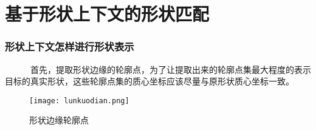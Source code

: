 \documentclass[notheorems,mathserif,table,compress]{beamer}  %
\begin{document}
\begin{comment}
\section{形状上下文定义}


\begin{frame}
\frametitle{形状上下文\footnote{Serge Belongie,Jitendra Malik,Jan Puzicha.Shape Matching and Object Recognition Using Shape Contexts.PAMI.2002.}}
   {\color{blue}\textbf{形状上下文}}将形状轮廓看作一个轮廓点集的基础上，根据轮廓序列上参考点与该轮廓序列上其他所有点的空间位置分部关系对物体的轮廓形状进行描述。\vspace{3ex}\\ %
{\color{blue}\textbf{优点}}\footnote{周瑜,刘俊涛,白翔.形状匹配方法研究与展望.自动化学报.2012.}：
\begin{itemize}
\item 这种表示方法有丰富的信息，对形状描述能力非常强。
\item 在尺度变化、平移和旋转时保持不变。
\item 在发生小的几何扭曲和存在异常点的时候具有较好的鲁棒性。
\end{itemize}

\end{frame}
\end{comment}

\section{基于形状上下文的形状匹配}

\begin{frame}
\frametitle{形状上下文怎样进行形状表示}
\begin{tcolorbox}[colback=red!5,colframe=blue!75!black]
~~~~~~首先，提取形状边缘的轮廓点，为了让提取出来的轮廓点集最大程度的表示目标的真实形状，这些轮廓点集的质心坐标应该尽量与原形状质心坐标一致。
   \begin{figure}[!ht]
    \centering
    \texttt{[image: lunkuodian.png]}
    \caption{形状边缘轮廓点}
   \end{figure}
\end{tcolorbox}
\end{frame}
\end{document}
